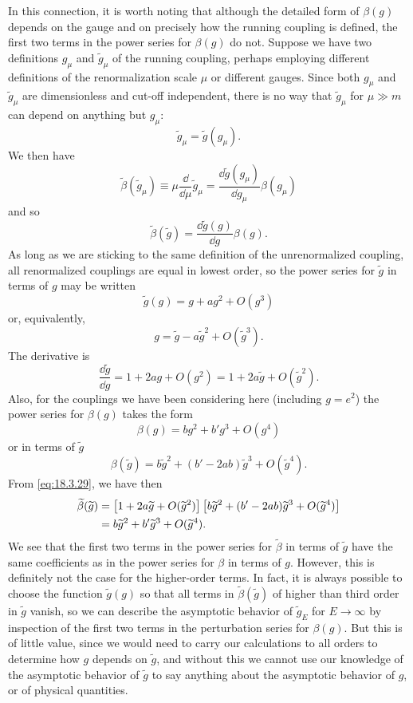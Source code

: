 In this connection, it is worth noting that although the detailed form of
$\beta(g)$ depends on the gauge and on precisely how the running coupling is
defined, the first two terms in the power series for $\beta(g)$ do not. Suppose
we have two definitions $g_\mu$ and $\widetilde g_\mu$ of the running coupling, perhaps
employing different definitions of the renormalization scale $\mu$ or different
gauges. Since both $g_\mu$ and $\widetilde g_\mu$ are dimensionless and cut-off independent,
there is no way that $\widetilde g_\mu$ for $\mu\gg m$ can depend on anything but $g_\mu$:
\[
\widetilde g_\mu=\widetilde g(g_\mu).
\]
We then have
\[
\widetilde\beta(\widetilde g_\mu)\equiv\mu\frac{\dd}{\dd\mu}\widetilde g_\mu
=\frac{\dd\widetilde g(g_\mu)}{\dd g_\mu}\beta(g_\mu)
\]
and so
\begin{equation}
\widetilde\beta(\widetilde g)=\frac{\dd\widetilde g(g)}{\dd g}\beta(g).
\label{eq:18.3.29}
\end{equation}
As long as we are sticking to the same definition of the unrenormalized
coupling, all renormalized couplings are equal in lowest order, so the
power series for $\widetilde g$ in terms of $g$ may be written
\[
\widetilde g(g)=g+ag^2+O(g^3)
\]
or, equivalently,
\[
g=\widetilde g-a\widetilde g^2+O(\widetilde g^3).
\]
The derivative is
\[
\frac{\dd\widetilde g}{\dd g}=1+2ag+O(g^2)=1+2a\widetilde g+O(\widetilde g^2).
\]
Also, for the couplings we have been considering here (including $g=e^2$)
the power series for $\beta(g)$ takes the form
\[
\beta(g)=bg^2+b'g^3+O(g^4)
\]
or in terms of $\widetilde g$
\[
\beta(\widetilde g)=b\widetilde g^2+(b'-2ab)\widetilde g^3+O(\widetilde g^4).
\]
From \eqref{eq:18.3.29}, we have then
\begin{align}
\widetilde\beta(\widetilde g)
&=\left[1+2a\widetilde g+O(\widetilde g^2)\right]
\left[b\widetilde g^2+(b'-2ab)\widetilde g^3+O(\widetilde g^4)\right] \notag\\
&=b\widetilde g^2+b'\widetilde g^3+O(\widetilde g^4).
\label{eq:18.3.30}
\end{align}
We see that the first two terms in the power series for $\widetilde\beta$ in terms of $\widetilde g$ have
the same coefficients as in the power series for $\beta$ in terms of $g$. However,
this is definitely not the case for the higher-order terms. In fact, it is
always possible to choose the function $\widetilde g(g)$ so that all terms in $\widetilde\beta(\widetilde g)$ of
higher than third order in $\widetilde g$ vanish, so we can describe the asymptotic
behavior of $\widetilde g_E$ for $E\to\infty$ by inspection of the first two terms in the
perturbation series for $\beta(g)$. But this is of little value, since we would
need to carry our calculations to all orders to determine how $g$ depends
on $\widetilde g$, and without this we cannot use our knowledge of the asymptotic
behavior of $\widetilde g$ to say anything about the asymptotic behavior of $g$, or of
physical quantities.

